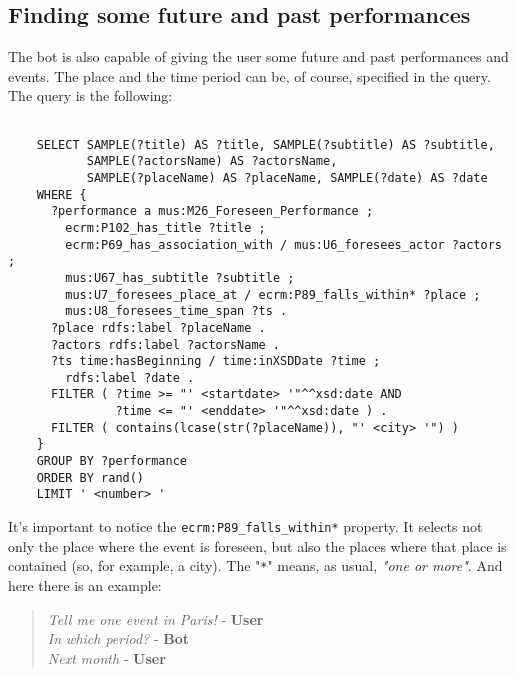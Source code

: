 	\subsection{Finding some future and past performances}
	The bot is also capable of giving the user some future and past performances and events. The place and the time period can be, of course, specified in the query. The query is the following:
	\begin{lstlisting}
	
	SELECT SAMPLE(?title) AS ?title, SAMPLE(?subtitle) AS ?subtitle,
	       SAMPLE(?actorsName) AS ?actorsName,
	       SAMPLE(?placeName) AS ?placeName, SAMPLE(?date) AS ?date
	WHERE {
	  ?performance a mus:M26_Foreseen_Performance ;
	    ecrm:P102_has_title ?title ;
	    ecrm:P69_has_association_with / mus:U6_foresees_actor ?actors ;
	    mus:U67_has_subtitle ?subtitle ;
	    mus:U7_foresees_place_at / ecrm:P89_falls_within* ?place ;
	    mus:U8_foresees_time_span ?ts .
	  ?place rdfs:label ?placeName .
	  ?actors rdfs:label ?actorsName .
	  ?ts time:hasBeginning / time:inXSDDate ?time ;
 	    rdfs:label ?date .
	  FILTER ( ?time >= "' <startdate> '"^^xsd:date AND
	           ?time <= "' <enddate> '"^^xsd:date ) .
	  FILTER ( contains(lcase(str(?placeName)), "' <city> '") )
	}
	GROUP BY ?performance
	ORDER BY rand()
	LIMIT ' <number> '
	\end{lstlisting}
	It's important to notice the \texttt{ecrm:P89\_falls\_within*} property. It selects not only the place where the event is foreseen, but also the places where that place is contained (so, for example, a city). The "\texttt{*}" means, as usual, \textit{"one or more"}. And here there is an example:
	\begin{verse}
		\textit{Tell me one event in Paris!} - \textbf{User}\\
		\textit{In which period?} - \textbf{Bot}\\
		\textit{Next month} - \textbf{User}\\
	\end{verse}
